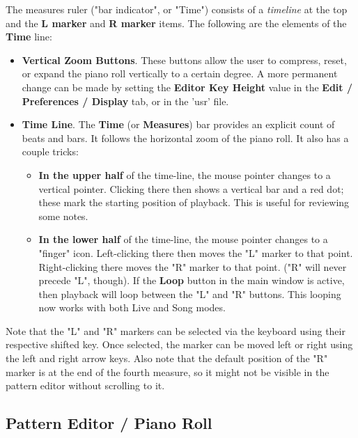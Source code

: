    The measures ruler ("bar indicator", or "Time")
   consists of a \textsl{timeline} at the top and the 
   \textbf{L marker} and \textbf{R marker} items.
   The following are the elements of the \textbf{Time} line:

   \begin{itemize}
      \item \textbf{Vertical Zoom Buttons}.
         These buttons allow the user to compress, reset, or expand the
         piano roll vertically to a certain degree.  A more permanent change
         can be made by setting the \textbf{Editor Key Height} value in
         the \textbf{Edit / Preferences / Display} tab, or in the 'usr' file.
      \item \textbf{Time Line}.
         The \textbf{Time} (or \textbf{Measures}) bar provides an explicit
         count of beats and bars.
         It follows the horizontal zoom of the piano roll.
         It also has a couple tricks:
         \begin{itemize}
            \item \textbf{In the upper half} of the time-line,
               the mouse pointer changes to a vertical pointer.
               Clicking there then shows a vertical bar and a red dot; these mark
               the starting position of playback.
               This is useful for reviewing some notes.
            \item \textbf{In the lower half} of the time-line,
               the mouse pointer changes to a "finger" icon.
               Left-clicking there then moves the "L" marker to that point.
               Right-clicking there moves the "R" marker to that point.
               ("R" will never precede "L", though).
               If the \textbf{Loop} button in the main window is active, then
               playback will loop between the "L" and "R" buttons.
               This looping now works with both Live and Song modes.
         \end{itemize}
   \end{itemize}

   Note that the "L" and "R" markers can be selected via the keyboard using
   their respective shifted key.  Once selected, the marker can be moved left
   or right using the left and right arrow keys.
   Also note that the default position of the "R" marker is at the end of the
   fourth measure, so it might not be visible in the pattern editor without
   scrolling to it.

\subsection{Pattern Editor / Piano Roll}
\label{subsec:pattern_editor_piano_roll}


